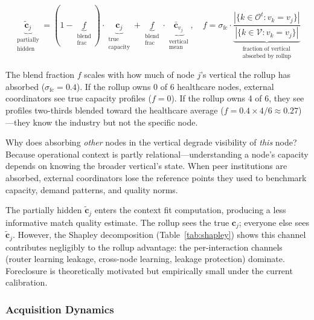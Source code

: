 \documentclass[12pt]{article}
\theoremstyle{definition}
\begin{document}
\begin{equation}
\label{eq:foreclosure}
\underbrace{\tilde{\mathbf{c}}_j}_{\substack{\text{partially} \\ \text{hidden}}} = (1 - \underbrace{f}_{\substack{\text{blend} \\ \text{frac}}}) \cdot \underbrace{\mathbf{c}_j}_{\substack{\text{true} \\ \text{capacity}}} + \underbrace{f}_{\substack{\text{blend} \\ \text{frac}}} \cdot \underbrace{\bar{\mathbf{c}}_{v_j}}_{\substack{\text{vertical} \\ \text{mean}}}, \quad f = \sigma_{\text{fc}} \cdot \underbrace{\frac{|\{k \in \mathcal{O}^t : v_k = v_j\}|}{|\{k \in \mathcal{V} : v_k = v_j\}|}}_{\substack{\text{fraction of vertical} \\ \text{absorbed by rollup}}}
\end{equation}

\noindent The blend fraction $f$ scales with how much of node $j$'s vertical the rollup has absorbed ($\sigma_{\text{fc}} = 0.4$). If the rollup owns 0 of 6 healthcare nodes, external coordinators see true capacity profiles ($f = 0$). If the rollup owns 4 of 6, they see profiles two-thirds blended toward the healthcare average ($f = 0.4 \times 4/6 \approx 0.27$)---they know the industry but not the specific node.

Why does absorbing \textit{other} nodes in the vertical degrade visibility of \textit{this} node? Because operational context is partly relational---understanding a node's capacity depends on knowing the broader vertical's state. When peer institutions are absorbed, external coordinators lose the reference points they used to benchmark capacity, demand patterns, and quality norms.

The partially hidden $\tilde{\mathbf{c}}_j$ enters the context fit computation, producing a less informative match quality estimate. The rollup sees the true $\mathbf{c}_j$; everyone else sees $\tilde{\mathbf{c}}_j$. However, the Shapley decomposition (Table~\ref{tab:shapley}) shows this channel contributes negligibly to the rollup advantage: the per-interaction channels (router learning leakage, cross-node learning, leakage protection) dominate. Foreclosure is theoretically motivated but empirically small under the current calibration.

\subsubsection{Acquisition Dynamics}
\end{document}
